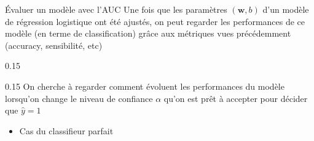 \documentclass[10pt]{beamer}
\begin{document}


\begin{frame}{Évaluer un modèle avec l'AUC}
Une fois que les paramètres $({\mathbf{w}}, {b})$ d'un modèle de régression logistique ont été ajustés, on peut regarder les performances de ce modèle (en terme de classification) grâce aux métriques vues précédemment (accuracy, sensibilité, etc)\\[1em]

	\begin{minipc}[0.12]{0.15}
	\raisebox{1.5mm}{\bclampe \xspace} 
\end{minipc}
\begin{minipc}[0.87]{0.15}
	On cherche à regarder comment évoluent les performances du modèle lorsqu'on change le niveau de confiance $\alpha$ qu'on est prêt à accepter pour décider que $\hat{y}=1$
\end{minipc}

\vspace*{16em}

\end{frame}

\begin{frame}
	
\end{frame}

\begin{frame}
	
\end{frame}

\begin{frame}
	\begin{itemize}
		\item Cas du classifieur parfait \\[24em]
	\end{itemize}
	
	
\end{frame}
\end{document}
